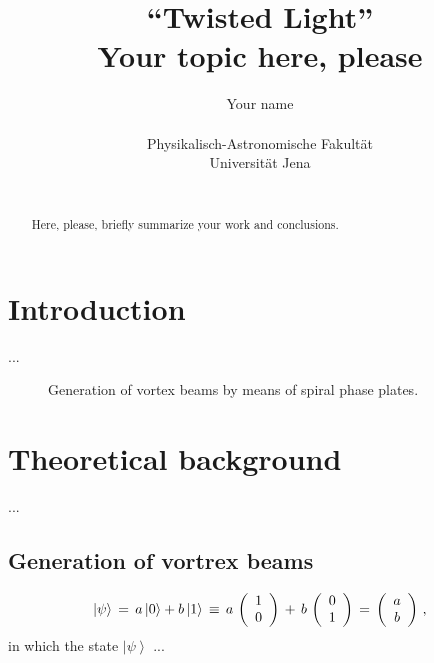 \documentclass[11pt]{article}
\def\ketm#1{     \left\vert   #1 \right\rangle   }
\begin{document}
\title{\textbf{``Twisted Light''} \\[0.1cm]
       Your topic here, please}

\author{Your name          \\
        \\
	Physikalisch-Astronomische Fakult\"a{}t \\[0.1cm]
        Universit\"a{}t Jena \\[0.1cm]
        \\
        }


\maketitle

\begin{abstract}
Here, please, briefly summarize your work and conclusions.
\end{abstract}

\bigskip
\bigskip


%
%
%
%
%
\section{Introduction}

...


%
%
%
%
%
\begin{figure}[b]
\begin{center}
  \caption{Generation of vortex beams by means of spiral phase plates.}
  \label{vortex-generation}
\end{center}
\end{figure}

%
%
%
%
%
\section{Theoretical background}

...


%
%
%
%
\subsection{Generation of vortrex beams}

%
\begin{equation}
   \ketm{\psi} \,=\,  a \ketm{0} + b \ketm{1} \,\equiv\,
   a \,       \left( {\begin{array}{*{20}c} {1 } \\ {0 } \end{array} } \right)
   \,+\, b \, \left( {\begin{array}{*{20}c} {0 } \\ {1 } \end{array} } \right)
   \,=\,
   \left( {\begin{array}{*{20}c}
   {a }  \\
   {b }  \\
   \end{array} } \right) \, ,
\end{equation}
%
in which the state $\ketm{\psi}$ ...
\end{document}
